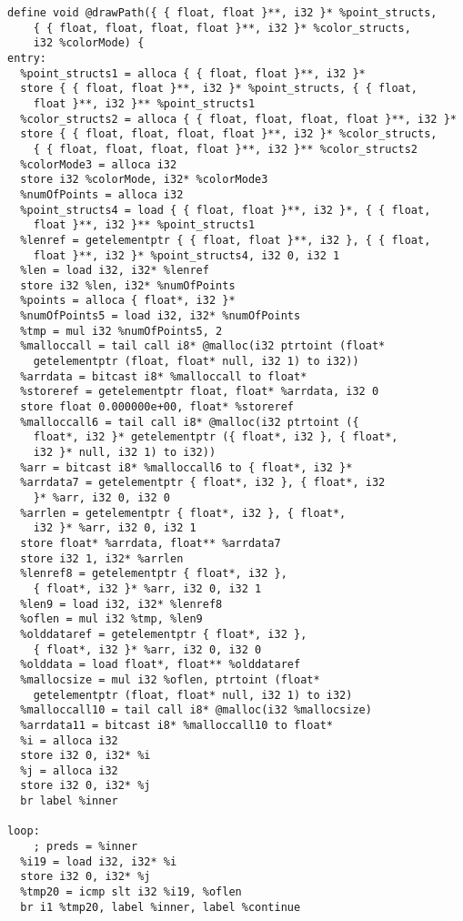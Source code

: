 \documentclass[main.tex]{subfiles}
\begin{document}
{\begin{lstlisting}
define void @drawPath({ { float, float }**, i32 }* %point_structs, 
    { { float, float, float, float }**, i32 }* %color_structs,
    i32 %colorMode) {
entry:
  %point_structs1 = alloca { { float, float }**, i32 }*
  store { { float, float }**, i32 }* %point_structs, { { float, 
    float }**, i32 }** %point_structs1
  %color_structs2 = alloca { { float, float, float, float }**, i32 }*
  store { { float, float, float, float }**, i32 }* %color_structs,
    { { float, float, float, float }**, i32 }** %color_structs2
  %colorMode3 = alloca i32
  store i32 %colorMode, i32* %colorMode3
  %numOfPoints = alloca i32
  %point_structs4 = load { { float, float }**, i32 }*, { { float,
    float }**, i32 }** %point_structs1
  %lenref = getelementptr { { float, float }**, i32 }, { { float,
    float }**, i32 }* %point_structs4, i32 0, i32 1
  %len = load i32, i32* %lenref
  store i32 %len, i32* %numOfPoints
  %points = alloca { float*, i32 }*
  %numOfPoints5 = load i32, i32* %numOfPoints
  %tmp = mul i32 %numOfPoints5, 2
  %malloccall = tail call i8* @malloc(i32 ptrtoint (float*
    getelementptr (float, float* null, i32 1) to i32))
  %arrdata = bitcast i8* %malloccall to float*
  %storeref = getelementptr float, float* %arrdata, i32 0
  store float 0.000000e+00, float* %storeref
  %malloccall6 = tail call i8* @malloc(i32 ptrtoint ({ 
    float*, i32 }* getelementptr ({ float*, i32 }, { float*,
    i32 }* null, i32 1) to i32))
  %arr = bitcast i8* %malloccall6 to { float*, i32 }*
  %arrdata7 = getelementptr { float*, i32 }, { float*, i32
    }* %arr, i32 0, i32 0
  %arrlen = getelementptr { float*, i32 }, { float*,
    i32 }* %arr, i32 0, i32 1
  store float* %arrdata, float** %arrdata7
  store i32 1, i32* %arrlen
  %lenref8 = getelementptr { float*, i32 },
    { float*, i32 }* %arr, i32 0, i32 1
  %len9 = load i32, i32* %lenref8
  %oflen = mul i32 %tmp, %len9
  %olddataref = getelementptr { float*, i32 },
    { float*, i32 }* %arr, i32 0, i32 0
  %olddata = load float*, float** %olddataref
  %mallocsize = mul i32 %oflen, ptrtoint (float*
    getelementptr (float, float* null, i32 1) to i32)
  %malloccall10 = tail call i8* @malloc(i32 %mallocsize)
  %arrdata11 = bitcast i8* %malloccall10 to float*
  %i = alloca i32
  store i32 0, i32* %i
  %j = alloca i32
  store i32 0, i32* %j
  br label %inner

loop:                                             
    ; preds = %inner
  %i19 = load i32, i32* %i
  store i32 0, i32* %j
  %tmp20 = icmp slt i32 %i19, %oflen
  br i1 %tmp20, label %inner, label %continue


\end{lstlisting}}
\end{document}
